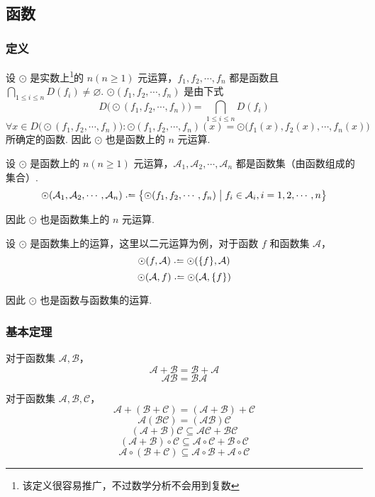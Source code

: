 \subsection{函数}
\subsubsection{定义}
\begin{definition}
    设 $\odot$ 是实数上\footnote{该定义很容易推广，不过数学分析不会用到复数}的 $n(n \geqslant 1)$ 元运算，$f_1, f_2, \cdots, f_n$ 都是函数且 $\displaystyle \bigcap_{1 \leqslant i \leqslant n}D(f_i) \neq \varnothing$. $\odot(f_1, f_2, \cdots, f_n)$ 是由下式
    \[D\bigl(\odot(f_1, f_2, \cdots, f_n)\bigr) = \bigcap_{1 \leqslant i \leqslant n}D(f_i)\]
    \[\forall x \in D\bigl(\odot(f_1, f_2, \cdots, f_n)\bigr): \odot(f_1, f_2, \cdots, f_n)(x) = \odot\bigl(f_1(x), f_2(x), \cdots, f_n(x)\bigr)\]
    所确定的函数. 因此 $\odot$ 也是函数上的 $n$ 元运算.
\end{definition}\vspace{9pt}

\begin{definition}
    设 $\odot$ 是函数上的 $n(n \geqslant 1)$ 元运算，$\mathcal{A}_1, \mathcal{A}_2, \cdots, \mathcal{A}_n$ 都是函数集（由函数组成的集合）.
    \[\odot(\mathcal{A}_1, \mathcal{A}_2, \cdots, \mathcal{A}_n) \defeq \bigl\{ \odot(f_1, f_2, \cdots, f_n) \bigm| f_i \in \mathcal{A}_i, i=1,2,\cdots,n\bigr\}\]

    因此 $\odot$ 也是函数集上的 $n$ 元运算.
\end{definition}\vspace{9pt}

\begin{definition}
    设 $\odot$ 是函数集上的运算，这里以二元运算为例，对于函数 $f$ 和函数集 $\mathcal{A}$，
    \[\odot(f,\mathcal{A}) \defeq \odot(\{f\},\mathcal{A})\]
    \[\odot(\mathcal{A},f) \defeq \odot(\mathcal{A}, \{f\})\]

    因此 $\odot$ 也是函数与函数集的运算.
\end{definition}

\subsubsection{基本定理}
\begin{theorem}
    对于函数集 $\mathcal{A}, \mathcal{B}$，
    \[\mathcal{A} + \mathcal{B} = \mathcal{B} + \mathcal{A}\]
    \[\mathcal{AB} = \mathcal{BA}\]
\end{theorem}\vspace{9pt}

\begin{theorem}
    对于函数集 $\mathcal{A},\mathcal{B},\mathcal{C}$，
    \[\mathcal{A} + (\mathcal{B} + \mathcal{C}) = (\mathcal{A} + \mathcal{B}) + \mathcal{C} \tag{1}\]
    \[\mathcal{A}(\mathcal{BC}) = (\mathcal{AB})\mathcal{C} \tag{2}\]
    \[(\mathcal{A} + \mathcal{B}) \mathcal{C} \subseteq \mathcal{AC} + \mathcal{BC} \tag{3}\]
    \[(\mathcal{A} + \mathcal{B}) \circ \mathcal{C} \subseteq \mathcal{A}\circ\mathcal{C} + \mathcal{B}\circ\mathcal{C} \tag{4}\]
    \[\mathcal{A}\circ(\mathcal{B} + \mathcal{C}) \subseteq \mathcal{A} \circ \mathcal{B} + \mathcal{A} \circ \mathcal{C} \tag{5}\]
\end{theorem}